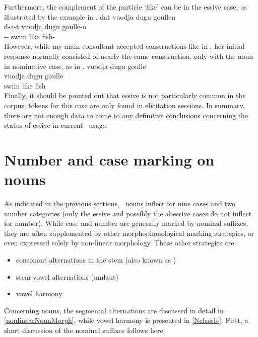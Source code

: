 Furthermore, the complement of the particle  ‘like’ can be in the essive case, as illustrated by the example in . 
\ea\label{ess3}
\glll	dat vuodja dugu {goullen}\\
	d-a-t vuodja dugu goulle-n\\
	-- swim\BS{} like fish-\\\nopagebreak
{} 
\z
However, while my main consultant accepted constructions like in , her initial response normally consisted of nearly the same construction, only with the noun in nominative case, as in . 
\ea\label{ess4}
\glll	vuodja dugu {goulle}\\
	vuodja dugu goulle\\
	swim\BS{} like fish\BS{}\\\nopagebreak
{} 
\z
Finally, it should be pointed out that essive is not particularly common in the corpus; tokens for this case are only found in elicitation sessions. In summary, there are not enough data to come to any definitive conclusions concerning the status of essive in current \PS\ usage. 


\section{Number and case marking on nouns}\label{NumCaseNouns}
As indicated in the previous sections, \PS\ nouns inflect for nine cases and two number categories (only the essive and possibly the abessive cases do not inflect for number). While case and number are generally marked by nominal suffixes, they are often supplemented by other morphophonological marking strategies, or even expressed solely by non-linear morphology. These other strategies are: 
\begin{itemize}
\item{consonant alternations in the stem (also known as )}
\item{stem-vowel alternations (umlaut)}
\item{vowel harmony}
\end{itemize} %
Concerning nouns, the segmental alternations are discussed in detail in \SEC\ref{nonlinearNounMorph}, while vowel harmony is presented in \SEC\ref{NclassIe}. First, a short discussion of the nominal suffixes follows here.


